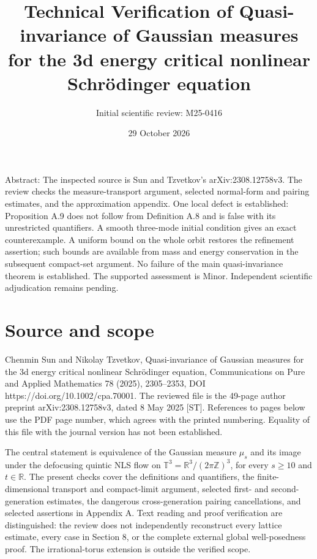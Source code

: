 \documentclass[10pt]{article}
\title{Technical Verification of
Quasi-invariance of Gaussian measures for the 3d energy critical nonlinear Schrödinger equation}
\author{Initial scientific review: M25-0416}
\date{29 October 2026}
\begin{document}
\maketitle
Abstract: The inspected source is Sun and Tzvetkov’s arXiv:2308.12758v3. The review checks the measure-transport argument, selected normal-form and pairing estimates, and the approximation appendix. One local defect is established: Proposition A.9 does not follow from Definition A.8 and is false with its unrestricted quantifiers. A smooth three-mode initial condition gives an exact counterexample. A uniform bound on the whole orbit restores the refinement assertion; such bounds are available from mass and energy conservation in the subsequent compact-set argument. No failure of the main quasi-invariance theorem is established. The supported assessment is Minor. Independent scientific adjudication remains pending.\par
\section*{Source and scope}
Chenmin Sun and Nikolay Tzvetkov, Quasi-invariance of Gaussian measures for the 3d energy critical nonlinear Schrödinger equation, Communications on Pure and Applied Mathematics 78 (2025), 2305–2353, DOI https://doi.org/10.1002/cpa.70001. The reviewed file is the 49-page author preprint arXiv:2308.12758v3, dated 8 May 2025 [ST]. References to pages below use the PDF page number, which agrees with the printed numbering. Equality of this file with the journal version has not been established.\par
The central statement is equivalence of the Gaussian measure \(\mu_s\) and its image under the defocusing quintic NLS flow on \(\mathbb T^3=\mathbb R^3/(2\pi\mathbb Z)^3\), for every \(s\geq10\) and \(t\in\mathbb R\). The present checks cover the definitions and quantifiers, the finite-dimensional transport and compact-limit argument, selected first- and second-generation estimates, the dangerous cross-generation pairing cancellations, and selected assertions in Appendix A. Text reading and proof verification are distinguished: the review does not independently reconstruct every lattice estimate, every case in Section 8, or the complete external global well-posedness proof. The irrational-torus extension is outside the verified scope.\par
\end{document}
